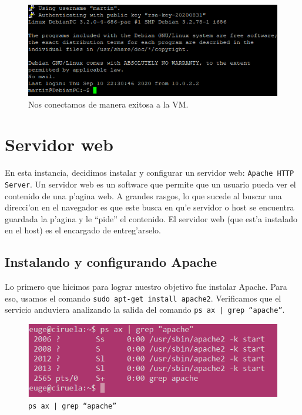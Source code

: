 \documentclass[11pt]{article}
\begin{document}
		\begin{figure}[H]
    			\centering
    			\includegraphics[scale=0.75]{Images/Connection/final_connection.PNG}
    			\caption{Nos conectamos de manera exitosa a la VM.}
    			\label{fig:final_connection}
		\end{figure}
		
		
	\section{Servidor web}

		En esta instancia, decidimos instalar y configurar un servidor web: \texttt{Apache HTTP Server}. Un servidor web es un software que permite que un usuario pueda ver el contenido de una p'agina web. A grandes rasgos, lo que sucede al buscar una direcci'on en el navegador es que este busca en qu'e servidor o host se encuentra guardada la p'agina y le ``pide'' el contenido. El servidor web (que est'a instalado en el host) es el encargado de entreg'arselo.
		
		\subsection{Instalando y configurando Apache}

		Lo primero que hicimos para lograr nuestro objetivo fue instalar Apache. Para eso, usamos el comando \texttt{sudo apt-get install apache2}. Verificamos que el servicio anduviera analizando la salida del comando \texttt{ps ax | grep ``apache''}.


		\begin{figure}[H]
    			\centering
   			\includegraphics[scale=0.6]{Images/Apache/fig1.png}
   			\caption{\texttt{ps ax | grep ``apache''}}
    			\label{fig:1}
		\end{figure}
\end{document}
